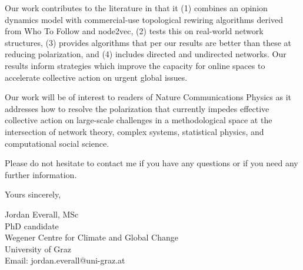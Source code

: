 \documentclass[a4paper,12pt]{letter}
\begin{document}
Our work contributes to the literature in that it (1) combines an opinion dynamics model with commercial-use topological rewiring algorithms derived from Who To Follow and node2vec, (2) tests this on real-world network structures, (3) provides algorithms that per our results are better than these at reducing polarization, and (4) includes directed and undirected networks. Our results inform strategies which improve the capacity for online spaces to accelerate collective action on urgent global issues.

Our work will be of interest to readers of Nature Communications Physics as it addresses how to resolve the polarization that currently impedes effective collective action on large-scale challenges in a methodological space at the intersection of network theory, complex systems, statistical physics, and computational social science.

Please do not hesitate to contact me if you have any questions or if you need any further information.

\vspace{1em}

\noindent
Yours sincerely,

\vspace{1em}

\noindent
Jordan Everall, MSc \\
PhD candidate \\
Wegener Centre for Climate and Global Change \\
University of Graz \\
Email: jordan.everall@uni-graz.at
\end{document}
